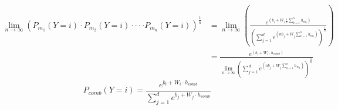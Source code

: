 \documentclass{article} %
\begin{document}
\begin{equation}
\begin{split}
\lim_{n\rightarrow \infty }(P_{m_{1}}(Y=i)\cdot P_{m_{2}}(Y=i)\cdot\cdot \cdot \cdot P_{m_{n}}(Y=i))^{\frac{1}{n}}&=\lim_{n\rightarrow \infty }(\frac{e^{(b_{i}+W_{i}\frac{1}{n}\sum_{k=1}^{n}h_{m_{k}})}}{(\sum_{j=1}^{d}e^{(nb_{j}+W_{j}\sum_{k=1}^{n}h_{m_{k}})})^{\frac{1}{n}}})
 \\
           &= \frac{e^{(b_{i}+W_{i}\cdot h_{comb})}}{\lim_{n\rightarrow \infty }(\sum_{j=1}^{d}e^{(nb_{j}+W_{j}\sum_{k=1}^{n}h_{m_{k}})})^{\frac{1}{n}}}
\end{split}
\end{equation}
\begin{equation}
P_{comb}(Y=i)=\frac{e^{b_{i}+W_{i}\cdot h_{comb}}}{\sum_{j=1}^{d}e^{b_{j}+W_{j}\cdot h_{comb}}}
\end{equation}
\end{document}
